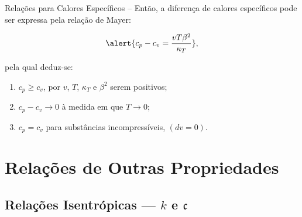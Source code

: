 \begin{frame}[allowframebreaks]{Relações para Calores Específicos --}
        \pagebreak
        Então, a diferença de calores específicos pode ser expressa pela \alert{relação de
        Mayer}:

        \begin{equation*}
            \alert{
                c_p - c_v =
                    \frac{vT\beta^2}{\kappa_T}
            },
        \end{equation*}

        \noindent pela qual deduz-se:\vspace*\medskipamount

        \begin{enumerate}
            \item \alert{$c_p \geqslant c_v$}, por $v$, $T$, $\kappa_T$ e $\beta^2$ serem
                positivos;
            \item \alert{$c_p - c_v \to 0$ à medida em que $T \to 0$};
            \item \alert{$c_p = c_v$ para substâncias incompressíveis}, $(dv = 0)$.
        \end{enumerate}

    \end{frame}

\section{Relações de Outras Propriedades}

\subsection{Relações Isentrópicas --- $k$ e $\mathfrak{c}$}

